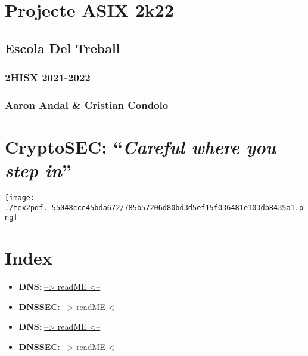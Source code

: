 \documentclass[]{article}
\date{}
\begin{document}
\hypertarget{projecte-asix-2k22}{%
\section{\texorpdfstring{\textbf{Projecte ASIX
2k22}}{Projecte ASIX 2k22}}\label{projecte-asix-2k22}}

\hypertarget{escola-del-treball}{%
\subsection{\texorpdfstring{\textbf{Escola Del
Treball}}{Escola Del Treball}}\label{escola-del-treball}}

\hypertarget{hisx-2021-2022}{%
\subsubsection{\texorpdfstring{\textbf{2HISX
2021-2022}}{2HISX 2021-2022}}\label{hisx-2021-2022}}

\hypertarget{aaron-andal-cristian-condolo}{%
\subsubsection{\texorpdfstring{\textbf{Aaron Andal \& Cristian
Condolo}}{Aaron Andal \& Cristian Condolo}}\label{aaron-andal-cristian-condolo}}

\hypertarget{cryptosec-careful-where-you-step-in}{%
\section{\texorpdfstring{\textbf{CryptoSEC}: ``\emph{Careful where you
step
in}''}{CryptoSEC: ``Careful where you step in''}}\label{cryptosec-careful-where-you-step-in}}

\texttt{[image: ./tex2pdf.-55048cce45bda672/785b57206d80bd3d5ef15f036481e103db8435a1.png]}

\hypertarget{index}{%
\section{\texorpdfstring{\textbf{Index}}{Index}}\label{index}}

\begin{itemize}
\item
  \textbf{DNS}: \href{}{--\textgreater{} readME \textless{}--}
\item
  \textbf{DNSSEC}: \href{}{--\textgreater{} readME \textless{}--}
\item
  \textbf{DNS}: \href{}{--\textgreater{} readME \textless{}--}
\item
  \textbf{DNSSEC}: \href{}{--\textgreater{} readME \textless{}--}
\end{itemize}
\end{document}
